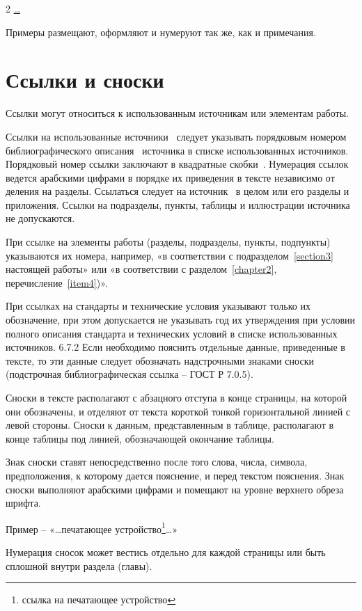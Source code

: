 \documentclass[14pt]{extreport}
\begin{document}
2 \underline{\ldots}

Примеры размещают, оформляют и нумеруют так же, как и примечания.


\section{Ссылки и сноски\label{section3}}

Ссылки могут относиться к использованным источникам или элементам работы.

Ссылки на использованные источники~\cite{bib1} следует указывать порядковым номером
библиографического описания~\cite{bib2, bib3, bib4, bib5} 
источника в списке использованных источников.
Порядковый номер ссылки заключают в квадратные скобки~\cite{bib6, bib7}. 
Нумерация ссылок ведется
арабскими цифрами в порядке их приведения в тексте независимо от деления  на
разделы. Ссылаться следует на источник~\cite{bib8, bib9, bib10, bib11, bib12} в целом или его разделы и приложения.
Ссылки на подразделы, пункты, таблицы и иллюстрации источника не допускаются.


При ссылке на элементы работы (разделы, подразделы, пункты, подпункты)
указываются их номера, например, «в соответствии с подразделом~\ref{section3} настоящей работы»
или «в соответствии с разделом~\ref{chapter2}, перечисление~\ref{item4})».

При ссылках на стандарты и технические условия указывают только их обозначение,
при этом допускается не указывать год их утверждения при условии полного
описания стандарта и технических условий в списке использованных источников.
6.7.2 Если необходимо пояснить отдельные данные, приведенные в тексте, то эти
данные следует обозначать надстрочными знаками сноски (подстрочная
библиографическая ссылка – ГОСТ Р 7.0.5).

Сноски в тексте располагают с абзацного отступа в конце страницы, на которой они
обозначены, и отделяют от текста короткой тонкой горизонтальной  линией с левой
стороны. Сноски к данным, представленным в таблице, располагают в конце таблицы
 под линией, обозначающей окончание таблицы.

 Знак сноски ставят непосредственно после того слова, числа, символа,
предположения, к которому дается пояснение, и перед текстом пояснения. Знак
сноски выполняют арабскими цифрами и помещают на уровне верхнего обреза шрифта.

Пример – «\ldots печатающее устройство\footnote{ссылка на печатающее устройство}\ldots»

Нумерация сносок может вестись отдельно для каждой страницы или быть сплошной
внутри раздела (главы).
\end{document}
